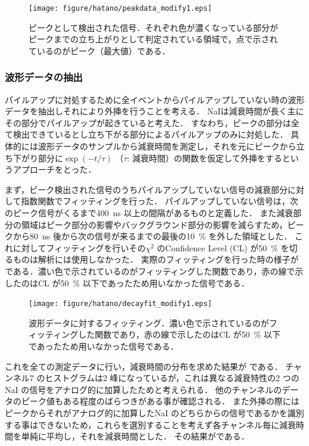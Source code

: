 \begin{figure}[hbt]
\centering
\texttt{[image: figure/hatano/peakdata\_modify1.eps]}
\caption{ピークとして検出された信号．それぞれ色が濃くなっている部分がピークまでの立ち上がりとして判定されている領域で，点で示されているのがピーク（最大値）である．}
\label{hatano_fig:peakdata}
\end{figure}

\subsubsection{波形データの抽出}
パイルアップに対処するために全イベントからパイルアップしていない時の波形データを抽出しそれにより外挿を行うことを考える．
NaIは減衰時間が長く主にその部分でパイルアップが起きていると考えた．
すなわち，ピークの部分は全て検出できているとし立ち下がる部分によるパイルアップのみに対処した．
具体的には波形データのサンプルから減衰時間を測定し，それを元にピークから立ち下がり部分に$\exp(-t/\tau)$ （$\tau$: 減衰時間）の関数を仮定して外挿をするというアプローチをとった．

まず，ピーク検出された信号のうちパイルアップしていない信号の減衰部分に対して指数関数でフィッティングを行った．
パイルアップしていない信号は，次のピーク信号がくるまで400~ns 以上の間隔があるものと定義した．
また減衰部分の領域はピーク部分の影響やバックグラウンド部分の影響を減らすため，ピークから80~ns 後から次の信号が来るまでの最後の10~\% を外した領域とした．
これに対してフィッティングを行いその$\chi^2$ のConfidence Level (CL) が50~\% を切るものは解析には使用しなかった．
実際のフィッティングを行った時の様子が である．濃い色で示されているのがフィッティングした関数であり，赤の線で示したのはCL が50~\% 以下であったため用いなかった信号である．

\begin{figure}[hbt]
\centering
\texttt{[image: figure/hatano/decayfit\_modify1.eps]}
\caption{波形データに対するフィッティング．濃い色で示されているのがフィッティングした関数であり，赤の線で示したのはCL が50~\% 以下であったため用いなかった信号である．}
\label{hatano_fig:decayfit}
\end{figure}

これを全ての測定データに行い，減衰時間の分布を求めた結果が である．
チャンネル7 のヒストグラムは2 峰になっているが，これは異なる減衰特性の2 つのNaI の信号をアナログ的に加算したためと考えられる．
他のチャンネルのデータのピーク値もある程度のばらつきがある事が確認される．
また外挿の際にはピークからそれがアナログ的に加算したNaI のどちらからの信号であるかを識別する事はできないため，これらを選別することを考えず各チャンネル毎に減衰時間を単純に平均し，それを減衰時間とした．
その結果がである．

